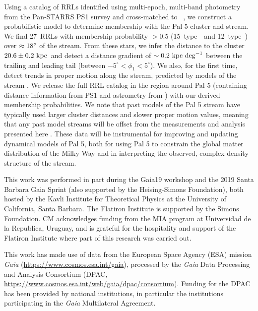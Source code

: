 \documentclass[twocolumn]{aastex63}
\newcommand{\sa}[1]{{\color{teal} SP: #1}}
\newcommand{\clderr}{\ensuremath{20.6 \pm 0.2~\kpc}}
\newcommand{\NRRL}{27}     %
\newcommand{\NRRab}{15}    %
\newcommand{\NRRc}{12}     %
\begin{document}
Using a catalog of RRLs identified using multi-epoch, multi-band photometry from the Pan-STARRS PS1 survey and cross-matched to \Gaia\ , we construct a probabilistic model to determine membership with the Pal 5 cluster and stream.
We find \NRRL\ RRLs with membership probability $>0.5$ (\NRRab\ type~\typeab\ and \NRRc\ type~\typec) over $\approx 18\mbox{$^\circ$}$ of the stream.
From these stars, we infer the distance to the cluster \clderr\ and detect a distance gradient of $\sim 0.2~\mathrm{kpc}~{\rm deg}^{-1}$ between the trailing and leading tail (between $-5^\circ < \phi_1 < 5^\circ$).
We also, for the first time, detect trends in proper motion along the stream, predicted by models of the stream \citep[e.g.,][]{Pearson:2017}.
We release the full RRL catalog in the region around Pal 5 (containing distance information from PS1 and astrometry from \Gaia) with our derived membership probabilities.
We note that past models of the Pal 5 stream have typically used larger cluster distances and slower proper motion values, meaning that any past model streams will be offset from the measurements and analysis presented here \citep[e.g.,][]{Kuepper:2015, Erkal:2017, Pearson:2017}.
These data will be instrumental for improving and updating dynamical models of Pal 5, both for using Pal 5 to constrain the global matter distribution of the Milky Way and in interpreting the observed, complex density structure of the stream.


\acknowledgments

This work was performed in part during the Gaia19 workshop and the 2019 Santa Barbara Gaia Sprint (also supported by the Heising-Simons Foundation), both hosted by the Kavli Institute for Theoretical Physics at the University of California, Santa Barbara. The Flatiron Institute is supported by the Simons Foundation. CM acknowledges funding from the MIA program at Universidad de la Republica, Uruguay, and is grateful for the hospitality and support of the Flatiron Institute where part of this research was carried out.

This work has made use of data from the European Space Agency (ESA) mission
{\it Gaia} (\url{https://www.cosmos.esa.int/gaia}), processed by the {\it Gaia}
Data Processing and Analysis Consortium (DPAC,
\url{https://www.cosmos.esa.int/web/gaia/dpac/consortium}). Funding for the DPAC
has been provided by national institutions, in particular the institutions
participating in the {\it Gaia} Multilateral Agreement.
\end{document}
